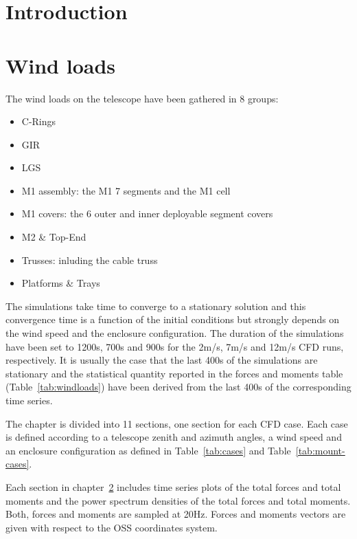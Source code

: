 \documentclass{gmto-book}
\begin{document}
\clearpage

\tableofcontents
\listoffigures
\listoftables

\clearpage

\chapter{Introduction}
\label{sec:introduction}



%
\chapter{Wind loads}
\label{cfd-wind-loads}

The wind loads on the telescope have been gathered in 8 groups:
\begin{itemize}
\item C-Rings
\item GIR
\item LGS
\item M1 assembly: the M1 7 segments and the M1 cell
\item M1 covers: the 6 outer and inner deployable segment covers
\item M2 \& Top-End
\item Trusses: inluding the cable truss
\item Platforms \& Trays
\end{itemize}

The simulations take time to converge to a stationary solution and this convergence time is a function of the initial conditions but strongly depends on the wind speed and the enclosure configuration.
The duration of the simulations have been set to 1200s, 700s and 900s for the 2m/s, 7m/s and 12m/s CFD runs, respectively.
It is usually the case that the last 400s of the simulations are stationary and
the statistical quantity reported in the forces and moments table (Table~\ref{tab:windloads}) have been derived from
the last 400s of the corresponding time series.

The chapter is divided into 11 sections, one section for each CFD case.
Each case is defined according to a telescope zenith and azimuth angles, a wind
speed and an enclosure configuration as defined in Table~\ref{tab:cases} and Table~\ref{tab:mount-cases}.

Each section in  chapter~\ref{cfd-wind-loads} includes time series plots of the total forces and total moments and the power spectrum densities of the total forces and total moments.
Both, forces and moments are sampled at 20Hz.
Forces and moments vectors are given with respect to the OSS coordinates system. 
\end{document}
